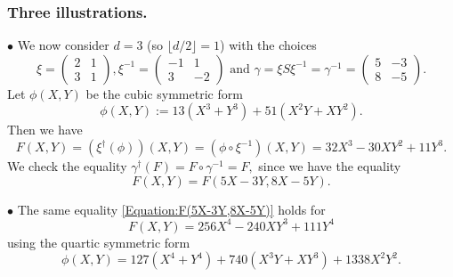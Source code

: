 \documentclass[10pt]{article}
\theoremstyle{definition}
\numberwithin{equation}{section}
\begin{document}
\subsubsection{Three illustrations.} 
$\bullet $ We now consider $d=3$ (so $\lfloor d/2\rfloor =1$) with the choices 
\[
\xi =\begin{pmatrix} 2& 1\\3& 1\end{pmatrix}, \xi^{-1} =\begin{pmatrix} -1& 1\\3& -2\end{pmatrix} \text{ and } \gamma = \xi S \xi^{-1} =\gamma^{-1}= \begin{pmatrix}5& -3\\ 8& -5\end{pmatrix}.
\]
Let $\phi (X,Y)$ be the cubic symmetric form
\[
\phi (X,Y):= 13(X^3+Y^3) +51 (X^2 Y +XY^2).
\]
Then we have
\[ F(X,Y) = 
\left(\xi^\dag (\phi)\right)(X,Y) = (\phi \circ \xi^{-1}) (X,Y) = 32 X^3 -30XY^2 +11 Y^3.
\]
We check the equality
$ \gamma^\dag (F) = F\circ \gamma^{-1} =F,$ since we have the equality
\begin{equation}\label{Equation:F(5X-3Y,8X-5Y)}
F(X,Y) = F(5X-3Y, 8X-5Y).
\end{equation}

\noindent
$\bullet$ The same equality \eqref{Equation:F(5X-3Y,8X-5Y)} holds for 
\[
F(X,Y)=256 X^4 -240 XY^3 +111Y^4
\]
using the quartic symmetric form 
\[
\phi (X,Y)=127 (X^4+Y^4) + 740 (X^3 Y+ X Y^3) + 1338 X^2 Y^2.
\]
\end{document}
